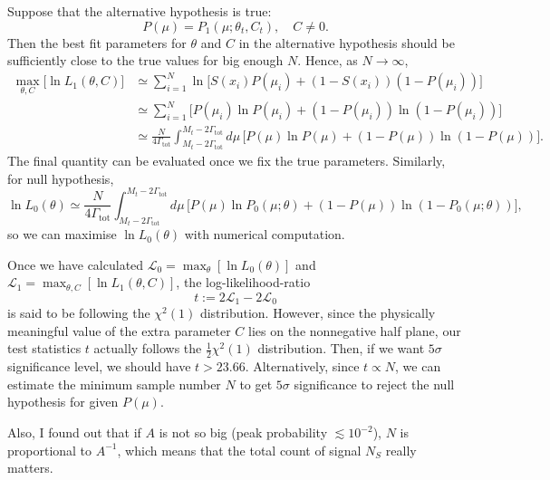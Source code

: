 \documentclass[10pt]{article}
\theoremstyle{definition}
\theoremstyle{remark}
\begin{document}
	Suppose that the alternative hypothesis is true:
	\[P(\mu)=P_{1}(\mu;\theta_{t},C_{t}),\quad C\neq0.\]
	Then the best fit parameters for $\theta$ and $C$ in the alternative hypothesis should be sufficiently close to the true values for big enough $N$.
	Hence, as $N\to\infty$,
	\begin{align*}
		\max_{\theta,C}\Big[\ln L_{1}(\theta,C)\Big]&\simeq\sum_{i=1}^{N}\ln\Big[S(x_{i})P(\mu_{i})+(1-S(x_{i}))(1-P(\mu_{i}))\Big]\\
		&\simeq\sum_{i=1}^{N}\Big[P(\mu_{i})\ln P(\mu_{i})+(1-P(\mu_{i}))\ln(1-P(\mu_{i}))\Big]\\
		&\simeq\frac{N}{4\Gamma_{\mathrm{tot}}}\int_{M_{t}-2\Gamma_{\mathrm{tot}}}^{M_{t}-2\Gamma_{\mathrm{tot}}}d\mu\,\Big[P(\mu)\ln P(\mu)+(1-P(\mu))\ln(1-P(\mu))\Big].
	\end{align*}
	The final quantity can be evaluated once we fix the true parameters.
	Similarly, for null hypothesis,
	\[\ln L_{0}(\theta)\simeq\frac{N}{4\Gamma_{\mathrm{tot}}}\int_{M_{t}-2\Gamma_{\mathrm{tot}}}^{M_{t}-2\Gamma_{\mathrm{tot}}}d\mu\,\Big[P(\mu)\ln P_{0}(\mu;\theta)+(1-P(\mu))\ln(1-P_{0}(\mu;\theta))\Big],\]
	so we can maximise $\ln L_{0}(\theta)$ with numerical computation.
	
	Once we have calculated $\mathcal{L}_{0}=\max_{\theta}[\ln L_{0}(\theta)]$ and $\mathcal{L}_{1}=\max_{\theta,C}[\ln L_{1}(\theta,C)]$, the log-likelihood-ratio
	\[t:=2\mathcal{L}_{1}-2\mathcal{L}_{0}\]
	is said to be following the $\chi^{2}(1)$ distribution.
	However, since the physically meaningful value of the extra parameter $C$ lies on the nonnegative half plane, our test statistics $t$ actually follows the $\frac{1}{2}\chi^{2}(1)$ distribution\cite{cowan2011asymptotic}.
	Then, if we want $5\sigma$ significance level, we should have $t>23.66$.
	Alternatively, since $t\propto N$, we can estimate the minimum sample number $N$ to get $5\sigma$ significance to reject the null hypothesis for given $P(\mu)$.
	
	Also, I found out that if $A$ is not so big (peak probability $\lesssim 10^{-2}$), $N$ is proportional to $A^{-1}$, which means that the total count of signal $N_{S}$ really matters.
	
\end{document}
